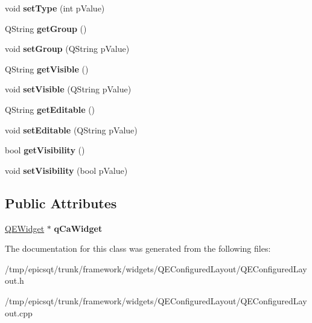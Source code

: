 \begin{DoxyCompactItemize}
\item 
\hypertarget{class__Field_a2e6b7388cc2db0d26e0374eb61aacbde}{
void {\bfseries setType} (int pValue)}
\label{class__Field_a2e6b7388cc2db0d26e0374eb61aacbde}

\item 
\hypertarget{class__Field_ac7a159d1b458349b7f28cf9235afd9cb}{
QString {\bfseries getGroup} ()}
\label{class__Field_ac7a159d1b458349b7f28cf9235afd9cb}

\item 
\hypertarget{class__Field_a6c36a78a916d85a9d67c802cf8e1cfe5}{
void {\bfseries setGroup} (QString pValue)}
\label{class__Field_a6c36a78a916d85a9d67c802cf8e1cfe5}

\item 
\hypertarget{class__Field_aef1a18454daac82318de026a9902c658}{
QString {\bfseries getVisible} ()}
\label{class__Field_aef1a18454daac82318de026a9902c658}

\item 
\hypertarget{class__Field_a8b85894c3082bd70cf75a9344ffbe219}{
void {\bfseries setVisible} (QString pValue)}
\label{class__Field_a8b85894c3082bd70cf75a9344ffbe219}

\item 
\hypertarget{class__Field_a2b148114be03b43b5756e01af637fc5e}{
QString {\bfseries getEditable} ()}
\label{class__Field_a2b148114be03b43b5756e01af637fc5e}

\item 
\hypertarget{class__Field_a705b6b8147f76086293d4d868d0814bb}{
void {\bfseries setEditable} (QString pValue)}
\label{class__Field_a705b6b8147f76086293d4d868d0814bb}

\item 
\hypertarget{class__Field_ac1aa5eee8f540fb2ead2a70ae0434f00}{
bool {\bfseries getVisibility} ()}
\label{class__Field_ac1aa5eee8f540fb2ead2a70ae0434f00}

\item 
\hypertarget{class__Field_a7befb80b6cf20997c37ad23e7c32b9e3}{
void {\bfseries setVisibility} (bool pValue)}
\label{class__Field_a7befb80b6cf20997c37ad23e7c32b9e3}

\end{DoxyCompactItemize}
\subsection*{Public Attributes}
\begin{DoxyCompactItemize}
\item 
\hypertarget{class__Field_af46aa68306238e8653ae2030ccb6d2b1}{
\hyperlink{classQEWidget}{QEWidget} $\ast$ {\bfseries qCaWidget}}
\label{class__Field_af46aa68306238e8653ae2030ccb6d2b1}

\end{DoxyCompactItemize}


The documentation for this class was generated from the following files:\begin{DoxyCompactItemize}
\item 
/tmp/epicsqt/trunk/framework/widgets/QEConfiguredLayout/QEConfiguredLayout.h\item 
/tmp/epicsqt/trunk/framework/widgets/QEConfiguredLayout/QEConfiguredLayout.cpp\end{DoxyCompactItemize}
